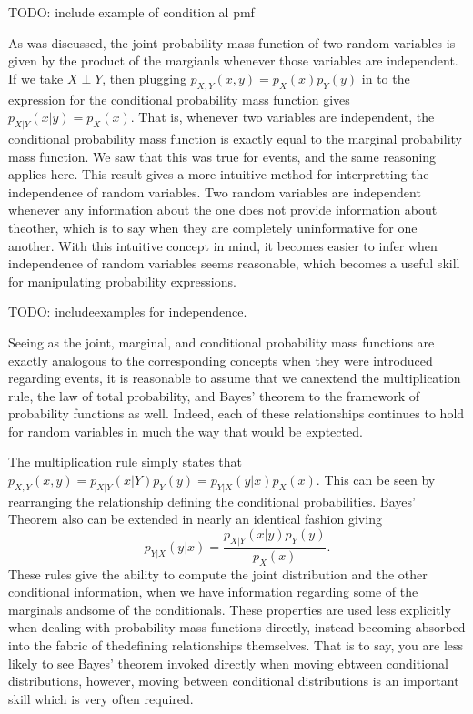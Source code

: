 \documentclass[
  letterpaper,
  DIV=11,
  numbers=noendperiod]{scrreprt}
\begin{document}
TODO: include example of condition al pmf

As was discussed, the joint probability mass function of two random
variables is given by the product of the margianls whenever those
variables are independent. If we take \(X\perp Y\), then plugging
\(p_{X,Y}(x,y) = p_{X}(x)p_{Y}(y)\) in to the expression for the
conditional probability mass function gives \(p_{X|Y}(x|y) = p_X(x)\).
That is, whenever two variables are independent, the conditional
probability mass function is exactly equal to the marginal probability
mass function. We saw that this was true for events, and the same
reasoning applies here. This result gives a more intuitive method for
interpretting the independence of random variables. Two random variables
are independent whenever any information about the one does not provide
information about theother, which is to say when they are completely
uninformative for one another. With this intuitive concept in mind, it
becomes easier to infer when independence of random variables seems
reasonable, which becomes a useful skill for manipulating probability
expressions.

TODO: includeexamples for independence.

Seeing as the joint, marginal, and conditional probability mass
functions are exactly analogous to the corresponding concepts when they
were introduced regarding events, it is reasonable to assume that we
canextend the multiplication rule, the law of total probability, and
Bayes' theorem to the framework of probability functions as well.
Indeed, each of these relationships continues to hold for random
variables in much the way that would be exptected.

The multiplication rule simply states that
\(p_{X,Y}(x,y) = p_{X|Y}(x|Y)p_Y(y) = p_{Y|X}(y|x)p_X(x)\). This can be
seen by rearranging the relationship defining the conditional
probabilities. Bayes' Theorem also can be extended in nearly an
identical fashion giving
\[p_{Y|X}(y|x) = \frac{p_{X|Y}(x|y)p_Y(y)}{p_X(x)}.\] These rules give
the ability to compute the joint distribution and the other conditional
information, when we have information regarding some of the marginals
andsome of the conditionals. These properties are used less explicitly
when dealing with probability mass functions directly, instead becoming
absorbed into the fabric of thedefining relationships themselves. That
is to say, you are less likely to see Bayes' theorem invoked directly
when moving ebtween conditional distributions, however, moving between
conditional distributions is an important skill which is very often
required.
\end{document}
